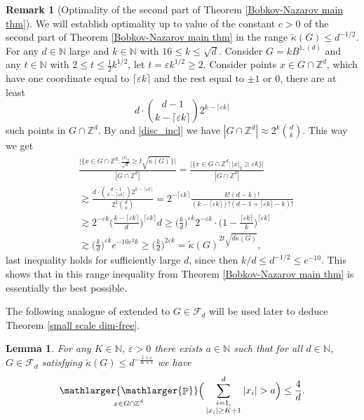 \documentclass[a4paper,oneside, reqno]{amsart}
\numberwithin{equation}{section}
\newtheorem{Lem}[Thm]{Lemma}
\theoremstyle{definition}%
\newtheorem{Rem}[Thm]{Remark}
\theoremstyle{definition}
\theoremstyle{definition}%
\theoremstyle{definition}
\newcommand{\Pro}{\mathop{\mathbb{P}}}
\newcommand{\Z}{\mathbb{Z}}
\newcommand{\N}{\mathbb{N}}
\newcommand{\spr}[1]{\underset{_{\substack{#1}}}{\mathlarger{\mathlarger{\Pro}}}}
\begin{document}
\begin{Rem}[Optimality of the second part of Theorem \ref{Bobkov-Nazarov main thm}] \label{optimality of small scale Bobkov-Nazarov} We will establish optimality up to value of the constant $c>0$ of the second part of Theorem \ref{Bobkov-Nazarov main thm} in the range $\widetilde{\kappa}(G) \le d^{-1/2}$.  For any $d \in \N$ large and $k \in \N$ with $16 \le k \le \sqrt{d}$. Consider $G=kB^{1,(d)}$ and any $t \in \N$ with $2 \le t \le  \frac{1}{2} k^{1/2}$, let $t= \varepsilon k^{1/2} \ge 2$. Consider points $x \in G \cap \Z^d$, which have one coordinate equal to $\lceil \varepsilon k \rceil$ and the rest equal to $\pm 1$ or $0$, there are at least 
\[
d \cdot \binom{d-1}{k-\lceil \varepsilon k \rceil} 2^{k-\lceil \varepsilon k \rceil}
\]
such points in $G \cap \Z^d$. By \cite[Corollary 1.8]{KNW} and \eqref{disc_incl} we have $|G \cap \Z^d| \approx 2^k \binom{d}{k}$. This way we get 
\begin{align*}
    &\frac{\Big|\Big\{ x \in G \cap \Z^d: \frac{|x|_2}{\sqrt{d}} \ge t \sqrt{\widetilde{\kappa}(G) } \Big\} \Big|}{|G \cap \Z^d|} = \frac{\Big|\Big\{ x \in G \cap \Z^d: |x|_2 \ge \varepsilon k \Big\} \Big|}{|G \cap \Z^d|} \\
    & \gtrsim \frac{d \cdot \binom{d-1}{k-\lceil \varepsilon k \rceil} 2^{k-\lceil \varepsilon k \rceil}}{2^k \binom{d}{k}}= 2^{- \lceil \varepsilon k \rceil} \frac{ k!(d-k)!}{(k-\lceil \varepsilon k \rceil)! (d-1+ \lceil \varepsilon k \rceil-k)!} \\
    &\gtrsim 2^{-\varepsilon k}\Big( \frac{k-\lceil \varepsilon k \rceil}{d} \Big)^{\lceil \varepsilon k \rceil} d \ge \Big( \frac{k}{d} \Big)^{\varepsilon k} 2^{-\varepsilon k } \cdot \Big(1- \frac{\lceil \varepsilon k \rceil}{k} \Big)^{\lceil \varepsilon k \rceil} \\
    &\gtrsim  \Big(\frac{k}{d} \Big)^{\varepsilon k} e^{-10 \varepsilon^2 k} \ge \Big( \frac{k}{d} \Big)^{ 2\varepsilon k}= \widetilde{\kappa}(G)^{2t \sqrt{d \widetilde{\kappa}(G)}},
\end{align*}
    last inequality holds for sufficiently large $d$, since then $k/d \le d^{-1/2} \le e^{-10}$. This shows that in this range inequality from Theorem \ref{Bobkov-Nazarov main thm} is essentially the best possible. 
\end{Rem}
The following analogue of \cite[Theorem 3.1]{NW} extended to $G \in \mathcal{F}_d$ will be used later to deduce
Theorem \ref{small scale dim-free}. 
\begin{Lem} \label{fun fact for sup sym conv body}
For any $K \in \N$, $\varepsilon>0$ there exists $a \in \N$ such that 
for all $d \in \N$, $G \in \mathcal{F}_d$ satisfying $\widetilde{\kappa}(G) \le d^{-\frac{1+\varepsilon}{K+1}}$ we have 
\[
\spr{x \in G \cap \Z^d} \Big(\sum_{\substack{i=1, \\ |x_i| \ge K+1}}^d
|x_i| > a \Big) \le \frac{4}{d}.
\]
\end{Lem}
\end{document}
